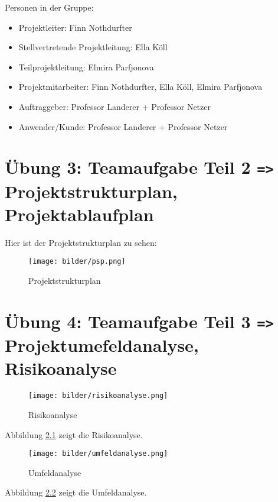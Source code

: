 \documentclass[a4paper,12pt]{report}
\begin{document}
Personen in der Gruppe:
\begin{itemize}[label=-] 
\item Projektleiter: Finn Nothdurfter
\item Stellvertretende Projektleitung: Ella Köll
\item Teilprojektleitung: Elmira Parfjonova
\item Projektmitarbeiter: Finn Nothdurfter, Ella Köll, Elmira Parfjonova
\item Auftraggeber: Professor Landerer + Professor Netzer
\item Anwender/Kunde: Professor Landerer + Professor Netzer
\end{itemize}


    \chapter{Übung 3: Teamaufgabe Teil 2 \texttt{=>} Projektstrukturplan, Projektablaufplan}

    Hier ist der Projektstrukturplan zu sehen:

    \begin{figure}[h]
        \centering
        \texttt{[image: bilder/psp.png]}
        \caption{Projektstrukturplan}
        \label{fig:psp}
    \end{figure}

    \chapter{Übung 4: Teamaufgabe Teil 3 \texttt{=>} Projektumefeldanalyse, Risikoanalyse}

    \begin{figure}[h]
        \centering
        \texttt{[image: bilder/risikoanalyse.png]}
        \caption{Risikoanalyse}
        \label{fig:risikoanalyse}
    \end{figure}

    Abbildung \ref{fig:risikoanalyse} zeigt die Risikoanalyse.
    
    \begin{figure}[h]
        \centering
        \texttt{[image: bilder/umfeldanalyse.png]}
        \caption{Umfeldanalyse}
        \label{fig:umfeldanalyse}
    \end{figure}

    Abbildung \ref{fig:umfeldanalyse} zeigt die Umfeldanalyse.
    
\end{document}
